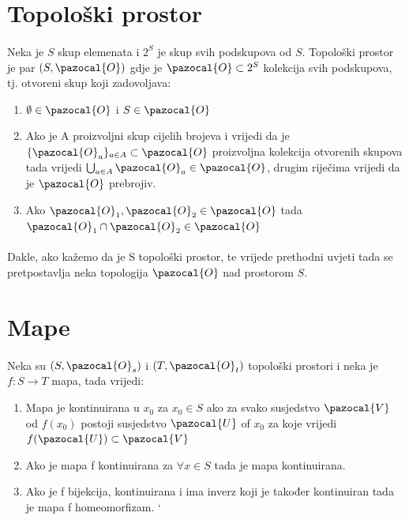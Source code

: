 \documentclass[times, utf8, diplomski, numeric]{fer}
\newcommand{\Oa}{\pazocal{O}}
\newcommand{\Va}{\pazocal{V}}
\newcommand{\Ua}{\pazocal{U}}
\begin{document}
\section{Topološki prostor}
	
	\paragraph{}Neka je $S$ skup elemenata i $2^S$ je skup svih podskupova od $S$. Topološki prostor je par $(S, \Oa)$ gdje je $\Oa\subset2^S$ kolekcija svih podskupova, tj. otvoreni skup koji zadovoljava:
	\begin{enumerate}
		\item $\emptyset \in \Oa$ i $S \in \Oa$ 
		
		\item Ako je A proizvoljni skup cijelih brojeva i vrijedi da je $\{ \Oa_{a} \}_{a\in A}\subset \Oa$ proizvoljna kolekcija otvorenih skupova tada vrijedi $\bigcup_{a\in A}\Oa_a\in \Oa$, drugim riječima vrijedi da je $\Oa$ prebrojiv.
		
		\item Ako $\Oa_1, \Oa_2 \in \Oa$ tada $\Oa_1 \cap \Oa_2 \in \Oa$
	\end{enumerate}
	\paragraph{}Dakle, ako kažemo da je S topološki prostor, te vrijede prethodni uvjeti tada se pretpostavlja neka topologija $\Oa$ nad prostorom $S$.

\newpage
\clearpage

\section{Mape}

	\paragraph{}Neka su $(S, \Oa_s)$ i $(T, \Oa_t)$ topološki prostori i neka je $f:S \rightarrow T$ mapa, tada vrijedi:
	
	\begin{enumerate}
		
		\item Mapa je kontinuirana u $x_0$ za $x_0 \in S$ ako za svako susjedstvo $\Va$ od $f(x_0)$ postoji susjedstvo $\Ua$ of $x_0$ za koje vrijedi $f(\Ua)\subset\Va$ 
		
		\item Ako je mapa f kontinuirana za $\forall x \in S$ tada je mapa kontinuirana.
		
		\item Ako je f bijekcija, kontinuirana i ima inverz koji je također kontinuiran tada je mapa f homeomorfizam.
`	
	\end{enumerate}
	
\end{document}
